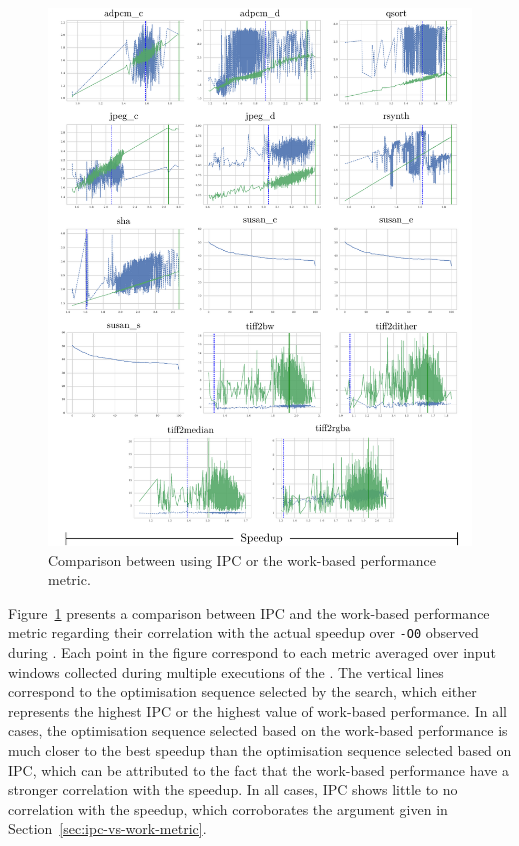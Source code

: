 \begin{figure}[h!]
    \centering
    \includegraphics[width=\textwidth]{figs/ipc-vs-work.pdf}
    \caption{Comparison between {\itercomp} using IPC or the work-based performance metric.}
    \label{fig:ipc-vs-work}
\end{figure}


Figure~\ref{fig:ipc-vs-work} presents a comparison between IPC and the work-based performance metric regarding their correlation with the actual speedup over \verb|-O0| observed during {\itercomp}.
Each point in the figure correspond to each metric averaged over input windows collected during multiple executions of the {\itercomp}.
The vertical lines correspond to the optimisation sequence selected by the {\itercomp} search, which either represents the highest IPC or the highest value of work-based performance.
In all cases, the optimisation sequence selected based on the work-based performance is much closer to the best speedup than the optimisation sequence selected based on IPC, which can be attributed to the fact that the work-based performance have a stronger correlation with the speedup.
In all cases, IPC shows little to no correlation with the speedup, which corroborates the argument given in Section~\ref{sec:ipc-vs-work-metric}.

